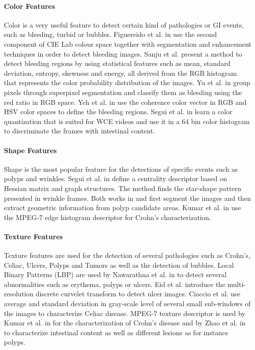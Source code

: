 \documentclass[review,12pt,3p]{elsarticle}
\begin{document}
\paragraph{Color Features}
Color is a very useful feature to detect certain kind of pathologies or GI events, such as bleeding, turbid or bubbles. Figuereido et al. in \cite{figueiredo2013computer} use the second component of CIE Lab colour space together with segmentation and enhancement techniques in order to detect bleeding images. Sanju et al. \cite{Sainju2014} present a method to detect bleeding regions by using statistical features such as mean, standard deviation, entropy, skewness and energy, all derived from the RGB histogram that represents the color probability distribution of the images. Yu et al. in \cite{6497444} group pixels through superpixel segmentation and classify them as bleeding using the red ratio in RGB space. Yeh et al. in \cite{yeh2014bleeding} use the coherence color vector in RGB and HSV color spaces to define the bleeding regions. Segui et al. in \cite{sseguiTurbid} learn a color quantization that is suited for WCE videos and use it in a 64 bin color histogram to discriminate the frames with intestinal content. 

\paragraph{Shape Features} Shape is the most popular feature for the detections of specific events such as polyps and wrinkles. Segui et al. in \cite{sseguiWrinkles} define a centrality descriptor based on Hessian matrix and graph structures. The method finds the star-shape pattern presented in wrinkle frames. Both works in \cite{polypsMamonov} and \cite{silivaPolyp2014} first segment the images and then extract geometric information from polyp candidate areas. Kumar et al. in \cite{6051474} use the MPEG-7 edge histogram descriptor for Crohn's characterization.

\paragraph{Texture Features} Texture features are used for the detection of several pathologies such as Crohn's, Celiac, Ulcers, Polyps and Tumors as well as the detection of bubbles. Local Binary Patterns (LBP) are used by Nawarathna et al. in \cite{nawarathna2014abnormal} to detect several abnormalities such as erythema, polyps or ulcers. Eid et al. \cite{Eid2013} introduce the multi-resolution discrete curvelet transform \cite{candes2006fast} to detect ulcer images. Ciaccio et al. \cite{ciaccio2013implementation} use average and standard deviation in gray-scale level of several small sub-windows of the images to characterize Celiac disease.  MPEG-7 texture descriptor is used by Kumar et al. in \cite{6051474} for the characterization of Crohn's disease and by Zhao et al. in \cite{zhao2015general} to characterize intestinal content as well as different lesions as for instance polyps.
\end{document}
